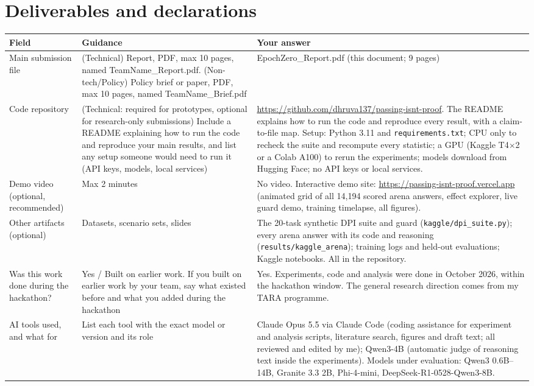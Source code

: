 \section{Deliverables and declarations}
{\small\noindent\begin{xltabular}{\textwidth}{@{}L{0.15\textwidth} L{0.28\textwidth} Y@{}}
\toprule
\textbf{Field} & \textbf{Guidance} & \textbf{Your answer} \\
\midrule
\endhead
Main submission file & (Technical) Report, PDF, max 10 pages, named TeamName\_Report.pdf. (Non-tech/Policy) Policy brief or paper, PDF, max 10 pages, named TeamName\_Brief.pdf & EpochZero\_Report.pdf (this document; 9 pages) \\
Code repository & (Technical: required for prototypes, optional for research-only submissions) Include a README explaining how to run the code and reproduce your main results, and list any setup someone would need to run it (API keys, models, local services) & \url{https://github.com/dhruva137/passing-isnt-proof}. The README explains how to run the code and reproduce every result, with a claim-to-file map. Setup: Python 3.11 and \texttt{requirements.txt}; CPU only to recheck the suite and recompute every statistic; a GPU (Kaggle T4$\times$2 or a Colab A100) to rerun the experiments; models download from Hugging Face; no API keys or local services. \\
Demo video (optional, recommended) & Max 2 minutes & No video. Interactive demo site: \url{https://passing-isnt-proof.vercel.app} (animated grid of all 14,194 scored arena answers, effect explorer, live guard demo, training timelapse, all figures). \\
Other artifacts (optional) & Datasets, scenario sets, slides & The 20-task synthetic DPI suite and guard (\texttt{kaggle/dpi\_suite.py}); every arena answer with its code and reasoning (\texttt{results/kaggle\_arena}); training logs and held-out evaluations; Kaggle notebooks. All in the repository. \\
Was this work done during the hackathon? & Yes / Built on earlier work. If you built on earlier work by your team, say what existed before and what you added during the hackathon & Yes. Experiments, code and analysis were done in October 2026, within the hackathon window. The general research direction comes from my TARA programme. \\
AI tools used, and what for & List each tool with the exact model or version and its role & Claude Opus 5.5 via Claude Code (coding assistance for experiment and analysis scripts, literature search, figures and draft text; all reviewed and edited by me); Qwen3-4B (automatic judge of reasoning text inside the experiments). Models under evaluation: Qwen3 0.6B--14B, Granite 3.3 2B, Phi-4-mini, DeepSeek-R1-0528-Qwen3-8B. \\

\end{xltabular}}
